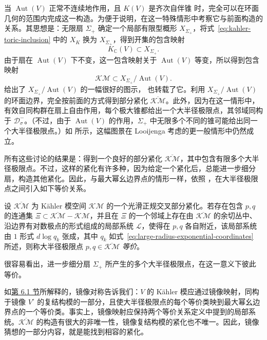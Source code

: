 当 $\operatorname{Aut}(V)$ 正常不连续地作用，且 $K(V)$ 是齐次自伴锥  时，完全可以在环面几何的范围内完成这一构造。为便于说明，在这一特殊情形中考察它与前面构造的关系。其思想是：无限扇 $\Sigma_+$ 确定一个局部有限型概形 $X_{\Sigma_+}$，将式~\eqref{eq:kahler-toric-inclusion} 中的 $X_K$ 换为 $X_{\Sigma_+}$，得到开集的包含映射
\[
K_{\mathbb C}(V)\subset X_{\Sigma_+}.
\]
由于扇在 $\operatorname{Aut}(V)$ 下不变，这一包含映射关于 $\operatorname{Aut}(V)$ 等变，所以得到包含映射
\[
\mathcal{KM}\subset X_{\Sigma_+}/\operatorname{Aut}(V).
\]
 给出了 $X_{\Sigma_+}/\operatorname{Aut}(V)$ 的一幅很好的图示， 也转载了它。利用 $X_{\Sigma_+}/\operatorname{Aut}(V)$ 的环面边界，完全按前面的方式得到部分紧化 $\overline{\mathcal{KM}}$。此外，因为在这一情形中，有效自同构群在扇上自由作用，每个极大锥都给出一个大半径极限点，其邻域同构于 $\mathcal D_\sigma^-$。（不过，由于 $\operatorname{Aut}(V)$ 的作用，$\Sigma_+$ 中无限多个不同的锥可能给出同一个大半径极限点。）如  所示，这幅图景在 Looijenga 考虑的更一般情形中仍然成立。

所有这些讨论的结果是：得到一个良好的部分紧化 $\overline{\mathcal{KM}}$，其中包含有限多个大半径极限点。不过，这样的紧化有许多种，因为给定一个紧化后，总能进一步细分扇，构造其他紧化。因此，与最大幂幺边界点的情形一样，依照 ，在大半径极限点之间引入如下等价关系。
\begin{definition}\label{def:equivalent-large-radius-points}
设 $\overline{\mathcal{KM}}$ 为 Kähler 模空间 $\mathcal{KM}$ 的一个光滑正规交叉部分紧化。若存在包含 $p,q$ 的连通集 $\Xi\subset\overline{\mathcal{KM}}-\mathcal{KM}$，并且在 $\Xi$ 的一个邻域上存在由 $\overline{\mathcal{KM}}$ 的余切丛中、沿边界有对数极点的形式组成的局部系统 $\mathcal L$，使得在 $p,q$ 各自附近，该局部系统由 $1$ 形式 $d\log q_k$ 张成，其中 $q_k$ 如式~\eqref{eq:large-radius-exponential-coordinates} 所述，则称大半径极限点 $p,q\in\overline{\mathcal{KM}}$ \emph{等价}。
\end{definition}
很容易看出，进一步细分扇 $\Sigma_+$ 所产生的多个大半径极限点，在这一意义下彼此等价。

如\hyperref[sec:complex-moduli]{第 6.1 节}所解释的，镜像对称告诉我们：$V$ 的 Kähler 模应通过镜像映射，同构于镜像 $V^\circ$ 的复结构模的一部分，且使大半径极限点的每个等价类映到最大幂幺边界点的一个等价类。事实上，镜像映射应保持两个等价关系定义中提到的局部系统。$\overline{\mathcal{KM}}$ 的构造有很大的非唯一性，镜像复结构模的紧化也不唯一。因此，镜像猜想的一部分内容，就是能找到相容的紧化。


